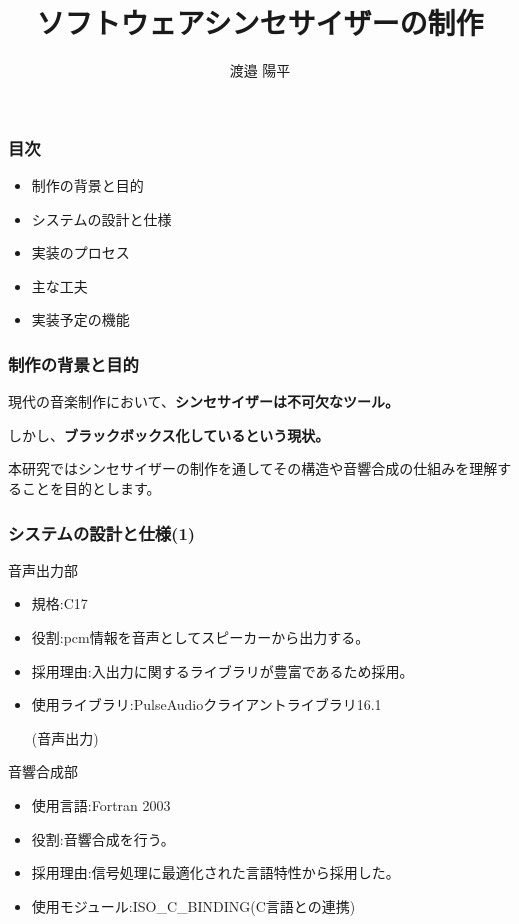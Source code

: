 \documentclass[dvipdfmx]{beamer} %
\title{ソフトウェアシンセサイザーの制作}
\author{渡邉 陽平}
\begin{document}
\begin{frame}
  \maketitle
\end{frame}

\begin{frame}
  \frametitle{目次}
  \begin{itemize}
  \item 制作の背景と目的
  \item システムの設計と仕様
  \item 実装のプロセス
  \item 主な工夫
  \item 実装予定の機能
  \end{itemize}
\end{frame}

\begin{frame}
  \frametitle{制作の背景と目的}
  現代の音楽制作において、\textbf{\Large シンセサイザーは不可欠なツール。}\par
  しかし、\textbf{\LARGE ブラックボックス化しているという現状。}\par
  \vspace{0.5cm}
  本研究ではシンセサイザーの制作を通してその構造や音響合成の仕組みを理解することを目的とします。\par
\end{frame}

\begin{frame}
  \frametitle{システムの設計と仕様(1)}
  \alert{\large 音声出力部}
  \begin{itemize}
  \item 規格:C17
  \item 役割:pcm情報を音声としてスピーカーから出力する。
  \item 採用理由:入出力に関するライブラリが豊富であるため採用。
  \item 使用ライブラリ:PulseAudioクライアントライブラリ16.1\par(音声出力)
  \end{itemize}
\vspace{0.5cm}
  \alert{\large 音響合成部}
  \begin{itemize}
  \item 使用言語:Fortran 2003
  \item 役割:音響合成を行う。
  \item 採用理由:信号処理に最適化された言語特性から採用した。
  \item 使用モジュール:ISO\_C\_BINDING(C言語との連携)
  \end{itemize}
\end{frame}    
\end{document}
